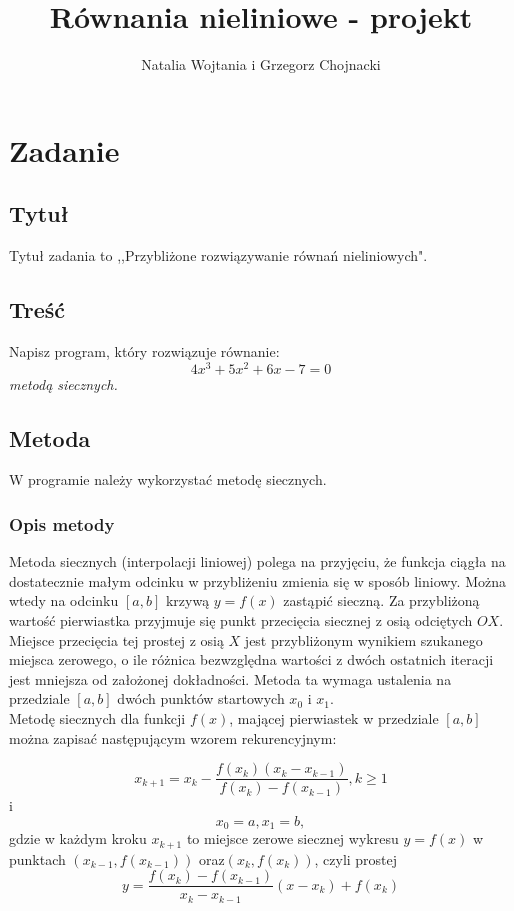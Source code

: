 \documentclass[12pt]{article}
\title{Równania nieliniowe - projekt}
\author{Natalia Wojtania i Grzegorz Chojnacki}
\begin{document}
\maketitle

\section{Zadanie}
\subsection{Tytuł}
Tytuł zadania to ,,Przybliżone rozwiązywanie równań nieliniowych".
\subsection{Treść}
Napisz program, który rozwiązuje równanie: $$4x^{3} + 5x^{2} + 6x - 7 = 0$$\emph{metodą siecznych.}
\subsection{Metoda}
W programie należy wykorzystać metodę siecznych.
\subsubsection{Opis metody}

Metoda siecznych (interpolacji liniowej) polega na przyjęciu, że funkcja ciągła na dostatecznie małym odcinku w przybliżeniu zmienia się w sposób liniowy. Można wtedy na odcinku $[a,b]$ krzywą $y=f(x)$ zastąpić sieczną. Za przybliżoną wartość pierwiastka przyjmuje się punkt przecięcia siecznej z osią odciętych $OX$. Miejsce przecięcia tej prostej z osią $X$ jest przybliżonym wynikiem szukanego miejsca zerowego, o ile różnica bezwzględna wartości z dwóch ostatnich iteracji jest mniejsza od założonej dokładności.  Metoda ta wymaga ustalenia na przedziale $[a,b]$ dwóch punktów startowych $x_0$ i $x_1$.\\
Metodę siecznych dla funkcji $f(x)$, mającej pierwiastek w przedziale $[ a , b ]$ można zapisać następującym wzorem rekurencyjnym:

 $$x_{k+1}=x_k - \frac{f(x_k)(x_k-x_{k-1})}{f(x_k)-f(x_{k-1})}, k \geq 1$$ i $$x_0=a, x_1=b, $$ gdzie w każdym kroku $ x_{k+1}$ to miejsce zerowe siecznej wykresu $y=f(x)$ w punktach $(x_{k-1},f(x_{k-1}))$ oraz$ (x_{k},f(x_{k})) $, czyli prostej $$y=\frac{f(x_k)-f(x_{k-1})}{x_k-x_{k-1}}(x-x_k)+f(x_k)$$
\end{document}
